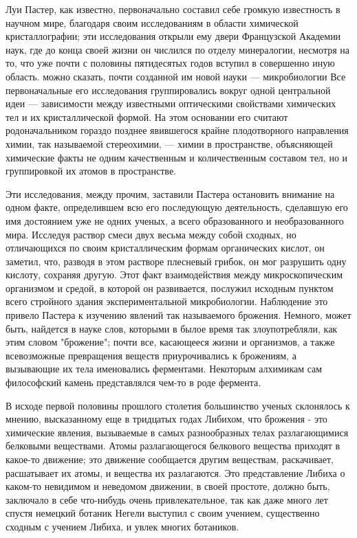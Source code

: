 Луи  Пастер,   как  известно,   первоначально  составил   себе   громкую
известность в  научном мире,  благодаря  своим исследованиям  в  области
химической  кристаллографии;   эти   исследования  открыли   ему   двери
Французской Академии  наук, где  до  конца своей  жизни он  числился  по
отделу минералогии, несмотря на то, что уже почти с половины пятидесятых
годов вступил в совершенно иную область. можно сказать, почти  созданной
им новой  науки  ---  микробиологии Все  первоначальные  его  исследования
группировались  вокруг  одной  центральной  идеи  ---  зависимости   между
известными оптическими свойствами  химических тел  и их  кристаллической
формой. На этом  основании его считают  родоначальником гораздо  позднее
явившегося  крайне  плодотворного  направления  химии,  так   называемой
стереохимии, ---  химии в  пространстве, объясняющей  химические факты  не
одним качественным и количественным составом  тел, но и группировкой  их
атомов в пространстве.

Эти исследования, между прочим, заставили Пастера остановить внимание на
одном факте, определившем  всю его  последующую деятельность,  сделавшую
его имя  достоянием  уже  не  одних  ученых,  а  всего  образованного  и
необразованного мира.  Исследуя раствор  смеси двух  весьма между  собой
сходных, но отличающихся  по своим  кристаллическим формам  органических
кислот, он заметил, что,  разводя в этом  растворе плесневый грибок,  он
мог разрушить одну  кислоту, сохраняя другую.  Этот факт  взаимодействия
между микроскопическим организмом  и средой, в  которой он  развивается,
послужил  исходным  пунктом  всего  стройного  здания  экспериментальной
микробиологии. Наблюдение  это привело  Пастера к  изучению явлений  так
называемого брожения.  Немного,  может  быть,  найдется  в  науке  слов,
которыми в былое время так  злоупотребляли, как этим словом  "брожение";
почти  все,  касающееся  жизни   и  организмов,  а  также   всевозможные
превращения веществ  приурочивались к  брожениям, а  вызывающие их  тела
именовались  ферментами.  Некоторым  алхимикам  сам  философский  камень
представлялся чем-то в роде фермента.

В исходе первой половины прошлого столетия большинство ученых склонялось
к мнению, высказанному еще в тридцатых  годах Либихом, что брожения -
это  химические  явления,   вызываемые  в   самых  разнообразных   телах
разлагающимися  белковыми  веществами.  Атомы  разлагающегося  белкового
вещества приходят в  какое-то движение; это  движение сообщается  другим
веществам, раскачивает, расшатывает их атомы, и вещества их разлагаются.
Это представление Либиха  о каком-то невидимом  и неведомом движении,  в
своей  простоте,  должно  быть,   заключало  в  себе  что-нибудь   очень
привлекательное, так как даже много  лет спустя немецкий ботаник  Негели
выступил с своим учением, существенно сходным с учением Либиха, и  увлек
многих ботаников.

